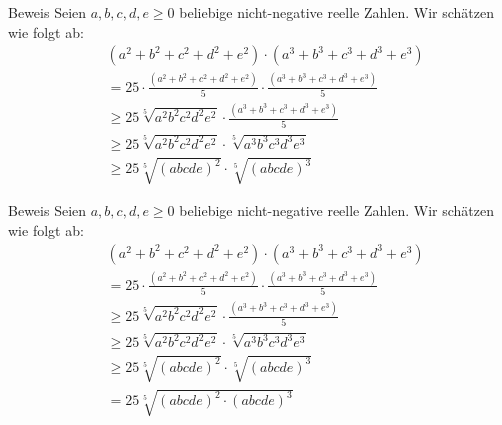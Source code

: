 \documentclass[10pt]{beamer}
\begin{document}
\begin{frame}{Beweis}
    Seien \( a, b, c, d, e \geq 0 \) beliebige nicht-negative reelle Zahlen. Wir schätzen wie folgt ab:
    \begin{align*}
        & \left( a^{2} + b^{2} + c^{2} + d^{2} + e^{2} \right) \cdot \left( a^{3} + b^{3} + c^{3} + d^{3} + e^{3} \right) \\
        & = 25 \cdot \frac{\left( a^{2} + b^{2} + c^{2} + d^{2} + e^{2} \right)}{5} \cdot \frac{\left( a^{3} + b^{3} + c^{3} + d^{3} + e^{3} \right)}{5} \\
        & \geq 25 \sqrt[5]{a^{2} b^{2} c^{2} d^{2} e^{2}} \cdot \frac{\left( a^{3} + b^{3} + c^{3} + d^{3} + e^{3} \right)}{5} \\
        & \geq 25 \sqrt[5]{a^{2} b^{2} c^{2} d^{2} e^{2}} \cdot \sqrt[5]{a^{3} b^{3} c^{3} d^{3} e^{3}} \\
        & \geq 25 \sqrt[5]{\left( a b c d e \right)^{2}} \cdot \sqrt[5]{\left( a b c d e \right)^{3}}
    \end{align*}
\end{frame}



\begin{frame}{Beweis}
    Seien \( a, b, c, d, e \geq 0 \) beliebige nicht-negative reelle Zahlen. Wir schätzen wie folgt ab:
    \begin{align*}
        & \left( a^{2} + b^{2} + c^{2} + d^{2} + e^{2} \right) \cdot \left( a^{3} + b^{3} + c^{3} + d^{3} + e^{3} \right) \\
        & = 25 \cdot \frac{\left( a^{2} + b^{2} + c^{2} + d^{2} + e^{2} \right)}{5} \cdot \frac{\left( a^{3} + b^{3} + c^{3} + d^{3} + e^{3} \right)}{5} \\
        & \geq 25 \sqrt[5]{a^{2} b^{2} c^{2} d^{2} e^{2}} \cdot \frac{\left( a^{3} + b^{3} + c^{3} + d^{3} + e^{3} \right)}{5} \\
        & \geq 25 \sqrt[5]{a^{2} b^{2} c^{2} d^{2} e^{2}} \cdot \sqrt[5]{a^{3} b^{3} c^{3} d^{3} e^{3}} \\
        & \geq 25 \sqrt[5]{\left( a b c d e \right)^{2}} \cdot \sqrt[5]{\left( a b c d e \right)^{3}} \\
        & = 25 \sqrt[5]{\left( a b c d e \right)^{2} \cdot \left( a b c d e \right)^{3}}
    \end{align*}
\end{frame}
\end{document}

